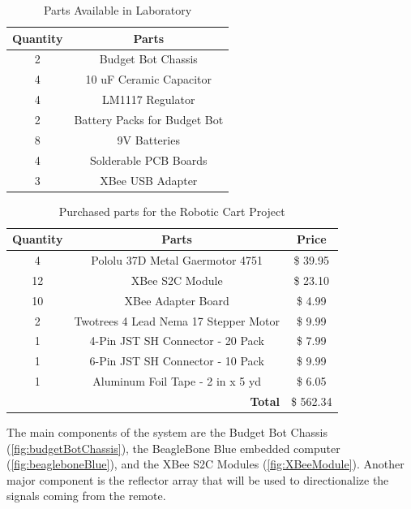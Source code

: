\documentclass[letterpaper,12pt]{article}   %
\begin{document}
\begin{table}[h!]
  \centering
  \begin{tabular}{c|c}
      \toprule
      \textbf{Quantity} & \textbf{Parts}\\
      \toprule
      2 & Budget Bot Chassis\\
      4 & 10 uF Ceramic Capacitor\\
      4 & LM1117 Regulator\\
      2 & Battery Packs for Budget Bot\\
      8 & 9V Batteries\\
      4 & Solderable PCB Boards\\
      3 & XBee USB Adapter\\
      \bottomrule
  \end{tabular}
  \caption{Parts Available in Laboratory}
  \label{tab:Partslablist}
\end{table}

\begin{table}[h!]
  \centering
  \begin{tabular}{c|c|c}
    \toprule
    \textbf{Quantity} & \textbf{Parts} & \textbf{Price}\\
    \toprule
    4 & Pololu 37D Metal Gaermotor 4751 & \$ 39.95\\
    12 & XBee S2C Module & \$ 23.10\\
    10 & XBee Adapter Board & \$ 4.99\\
    2 & Twotrees 4 Lead Nema 17 Stepper Motor & \$ 9.99\\
    1 & 4-Pin JST SH Connector - 20 Pack & \$ 7.99\\
    1 & 6-Pin JST SH Connector - 10 Pack & \$ 9.99\\
    1 & Aluminum Foil Tape - 2 in x 5 yd & \$ 6.05\\
    \bottomrule
    \multicolumn{2}{r|}{\textbf{Total}} & \$ 562.34\\
    \bottomrule
  \end{tabular}
  \caption{Purchased parts for the Robotic Cart Project}
  \label{tab:Partslist}
\end{table}

\vspace*{12pt}
\noindent
The main components of the system are the Budget Bot Chassis (\autoref{fig:budgetBotChassis}), the BeagleBone Blue embedded computer (\autoref{fig:beagleboneBlue}), and the XBee S2C Modules (\autoref{fig:XBeeModule}). Another major component is the reflector array that will be used to directionalize the signals coming from the remote.
\end{document}
